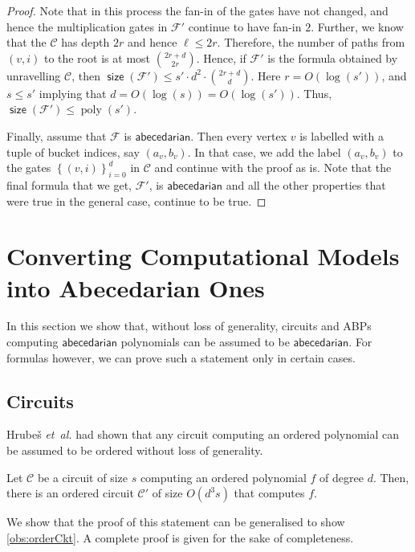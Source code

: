 \documentclass[10pt,a4paper]{article}
\def\etal{\emph{et~al.}}
\def\Hrubes{Hrube{\v{s}}}
\def\poly{\operatorname{poly}}
\def\set#1{\left\{ #1 \right\}}
\newcommand{\ckt}{\textbf{$\mathcal{C}$}}
\newcommand{\form}{\textbf{$\mathcal{F}$}}
\newcommand{\size}{\operatorname{\mathsf{size}}}
\newcommand{\abcd}{\mathsf{abecedarian}}
\begin{document}
\begin{proof}
	Note that in this process the fan-in of the gates have not changed, and hence the multiplication gates in $\form'$ continue to have fan-in $2$.
	Further, we know that the $\ckt$ has depth $2r$ and hence $\ell \leq 2r$. 
	Therefore, the number of paths from $(v, i)$ to the root is at most $2r + d \choose 2r$. 
	Hence, if $\form'$ is the formula obtained by unravelling $\ckt$, then $\size(\form') \leq s' \cdot d^2 \cdot {2r + d \choose d}$.	
	Here $r = O(\log(s'))$, and $s \leq s'$ implying that $d = O(\log(s)) = O(\log(s'))$.
	Thus, $\size(\form') \leq \poly(s')$.

	Finally, assume that $\form$ is $\abcd$.
	Then every vertex $v$ is labelled with a tuple of bucket indices, say $(a_v,b_v)$.
	In that case, we add the label $(a_v,b_v)$ to the gates $\set{(v,i)}_{i=0}^{d}$ in $\ckt$ and continue with the proof as is.
	Note that the final formula that we get, $\form'$, is $\abcd$ and all the other properties that were true in the general case, continue to be true.
\end{proof}


\section{Converting Computational Models into Abecedarian Ones}\label{sec:orderModels}

In this section we show that, without loss of generality, circuits and ABPs computing $\abcd$ polynomials can be assumed to be $\abcd$.
For formulas however, we can prove such a statement only in certain cases.

\subsection{Circuits}\label{sec:orderCkts}
{\Hrubes} {\etal} \cite{HWY11} had shown that any circuit computing an ordered polynomial can be assumed to be ordered without loss of generality. 

\begin{theoremwp}\label{thm:orderHomCkts}
	Let $\ckt$ be a circuit of size $s$ computing an ordered polynomial $f$ of degree $d$. 
	Then, there is an ordered circuit $\ckt'$ of size $O(d^3s)$ that computes $f$.
\end{theoremwp}

\noindent We show that the proof of this statement can be generalised to show \autoref{obs:orderCkt}. 
A complete proof is given for the sake of completeness.
\end{document}
